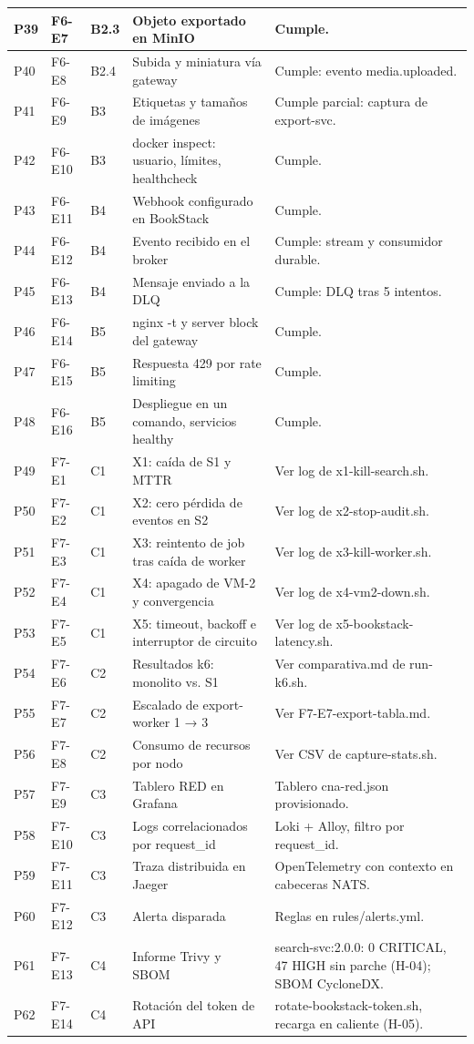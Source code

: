 \documentclass[11pt,a4paper]{article}
\begin{document}
\begin{longtable}{|p{0.9cm}|p{1.3cm}|p{0.9cm}|p{5.6cm}|p{5.6cm}|}
P39 & F6-E7 & B2.3 & Objeto exportado en MinIO & Cumple. \\ \hline
P40 & F6-E8 & B2.4 & Subida y miniatura vía gateway & Cumple: evento media.uploaded. \\ \hline
P41 & F6-E9 & B3 & Etiquetas y tamaños de imágenes & Cumple parcial: captura de export-svc. \\ \hline
P42 & F6-E10 & B3 & docker inspect: usuario, límites, healthcheck & Cumple. \\ \hline
P43 & F6-E11 & B4 & Webhook configurado en BookStack & Cumple. \\ \hline
P44 & F6-E12 & B4 & Evento recibido en el broker & Cumple: stream y consumidor durable. \\ \hline
P45 & F6-E13 & B4 & Mensaje enviado a la DLQ & Cumple: DLQ tras 5 intentos. \\ \hline
P46 & F6-E14 & B5 & nginx -t y server block del gateway & Cumple. \\ \hline
P47 & F6-E15 & B5 & Respuesta 429 por rate limiting & Cumple. \\ \hline
P48 & F6-E16 & B5 & Despliegue en un comando, servicios healthy & Cumple. \\ \hline
P49 & F7-E1 & C1 & X1: caída de S1 y MTTR & Ver log de x1-kill-search.sh. \\ \hline
P50 & F7-E2 & C1 & X2: cero pérdida de eventos en S2 & Ver log de x2-stop-audit.sh. \\ \hline
P51 & F7-E3 & C1 & X3: reintento de job tras caída de worker & Ver log de x3-kill-worker.sh. \\ \hline
P52 & F7-E4 & C1 & X4: apagado de VM-2 y convergencia & Ver log de x4-vm2-down.sh. \\ \hline
P53 & F7-E5 & C1 & X5: timeout, backoff e interruptor de circuito & Ver log de x5-bookstack-latency.sh. \\ \hline
P54 & F7-E6 & C2 & Resultados k6: monolito vs. S1 & Ver comparativa.md de run-k6.sh. \\ \hline
P55 & F7-E7 & C2 & Escalado de export-worker 1 → 3 & Ver F7-E7-export-tabla.md. \\ \hline
P56 & F7-E8 & C2 & Consumo de recursos por nodo & Ver CSV de capture-stats.sh. \\ \hline
P57 & F7-E9 & C3 & Tablero RED en Grafana & Tablero cna-red.json provisionado. \\ \hline
P58 & F7-E10 & C3 & Logs correlacionados por request\_id & Loki + Alloy, filtro por request\_id. \\ \hline
P59 & F7-E11 & C3 & Traza distribuida en Jaeger & OpenTelemetry con contexto en cabeceras NATS. \\ \hline
P60 & F7-E12 & C3 & Alerta disparada & Reglas en rules/alerts.yml. \\ \hline
P61 & F7-E13 & C4 & Informe Trivy y SBOM & search-svc:2.0.0: 0 CRITICAL, 47 HIGH sin parche (H-04); SBOM CycloneDX. \\ \hline
P62 & F7-E14 & C4 & Rotación del token de API & rotate-bookstack-token.sh, recarga en caliente (H-05). \\ \hline
\end{longtable}
\end{document}
